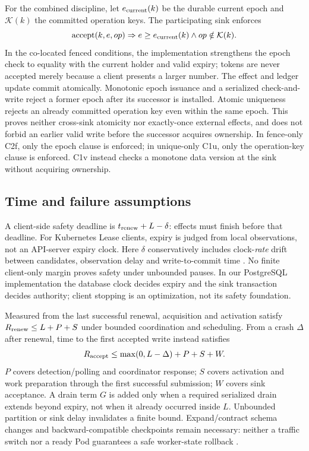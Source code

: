 \documentclass[conference,10pt]{IEEEtran}
\begin{document}
For the combined discipline, let $e_{\rm current}(k)$ be the durable current epoch and $\mathcal{K}(k)$ the committed operation keys. The participating sink enforces
\begin{equation}
\operatorname{accept}(k,e,op)\Rightarrow e\geq e_{\rm current}(k)\land op\notin \mathcal{K}(k).\label{eq:safety}
\end{equation}
In the co-located fenced conditions, the implementation strengthens the epoch check to equality with the current holder and valid expiry; tokens are never accepted merely because a client presents a larger number. The effect and ledger update commit atomically. Monotonic epoch issuance and a serialized check-and-write reject a former epoch after its successor is installed. Atomic uniqueness rejects an already committed operation key even within the same epoch. This proves neither cross-sink atomicity nor exactly-once external effects, and does not forbid an earlier valid write before the successor acquires ownership. In fence-only C2f, only the epoch clause is enforced; in unique-only C1u, only the operation-key clause is enforced. C1v instead checks a monotone data version at the sink without acquiring ownership.

\subsection{Time and failure assumptions}
A client-side safety deadline is $t_{\rm renew}+L-\delta$: effects must finish before that deadline. For Kubernetes Lease clients, expiry is judged from local observations, not an API-server expiry clock. Here $\delta$ conservatively includes clock-\emph{rate} drift between candidates, observation delay and write-to-commit time \cite{r24}. No finite client-only margin proves safety under unbounded pauses. In our PostgreSQL implementation the database clock decides expiry and the sink transaction decides authority; client stopping is an optimization, not its safety foundation.

Measured from the last successful renewal, acquisition and activation satisfy $R_{\rm renew}\leq L+P+S$ under bounded coordination and scheduling. From a crash $\Delta$ after renewal, time to the first accepted write instead satisfies
\begin{equation}
R_{\rm accept}\leq\max(0,L-\Delta)+P+S+W.\label{eq:takeover}
\end{equation}
$P$ covers detection/polling and coordinator response; $S$ covers activation and work preparation through the first successful submission; $W$ covers sink acceptance. A drain term $G$ is added only when a required serialized drain extends beyond expiry, not when it already occurred inside $L$. Unbounded partition or sink delay invalidates a finite bound. Expand/contract schema changes and backward-compatible checkpoints remain necessary: neither a traffic switch nor a ready Pod guarantees a safe worker-state rollback \cite{r19}.
\end{document}
